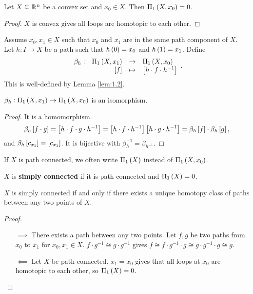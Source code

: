 \begin{example1}
Let $ X \subseteq \R^n $ be a convex set and $ x_0 \in X $. Then $ \Pi_1\rb{X, x_0} = 0 $.
\end{example1}

\begin{proof}
$ X $ is convex gives all loops are homotopic to each other.
\end{proof}

Assume $ x_0, x_1 \in X $ such that $ x_0 $ and $ x_1 $ are in the same path component of $ X $. Let $ h : I \to X $ be a path such that $ h\rb{0} = x_0 $ and $ h\rb{1} = x_1 $. Define
$$ \function[\beta_h]{\Pi_1\rb{X, x_1}}{\Pi_1\rb{X, x_0}}{\sb{f}}{\sb{h \cdot f \cdot h^{-1}}}. $$
This is well-defined by Lemma \ref{lem:1.2}.

\begin{proposition}
$ \beta_h : \Pi_1\rb{X, x_1} \to \Pi_1\rb{X, x_0} $ is an isomorphism.
\end{proposition}

\begin{proof}
It is a homomorphism.
$$ \beta_h\sb{f \cdot g} = \sb{h \cdot f \cdot g \cdot h^{-1}} = \sb{h \cdot f \cdot h^{-1}}\sb{h \cdot g \cdot h^{-1}} = \beta_h\sb{f} \cdot \beta_h\sb{g}, $$
and $ \beta_h\sb{c_{x_1}} = \sb{c_{x_1}} $. It is bijective with $ \beta_h^{-1} = \beta_{h^{-1}} $.
\end{proof}

If $ X $ is path connected, we often write $ \Pi_1\rb{X} $ instead of $ \Pi_1\rb{X, x_0} $.

\begin{definition}
$ X $ is \textbf{simply connected} if it is path connected and $ \Pi_1\rb{X} = 0 $.
\end{definition}

\begin{proposition}
$ X $ is simply connected if and only if there exists a unique homotopy class of paths between any two points of $ X $.
\end{proposition}

\begin{proof}
\hfill
\begin{itemize}
\item[$ \implies $] There exists a path between any two points. Let $ f, g $ be two paths from $ x_0 $ to $ x_1 $ for $ x_0, x_1 \in X $. $ f \cdot g^{-1} \cong g \cdot g^{-1} $ gives $ f \cong f \cdot g^{-1} \cdot g \cong g \cdot g^{-1} \cdot g \cong g $.
\item[$ \impliedby $] Let $ X $ be path connected. $ x_1 = x_0 $ gives that all loops at $ x_0 $ are homotopic to each other, so $ \Pi_1\rb{X} = 0 $.
\end{itemize}
\end{proof}

